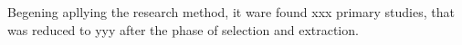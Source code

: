Begening apllying the research method, it ware found xxx primary studies, that was reduced to yyy after the phase of selection and extraction.








